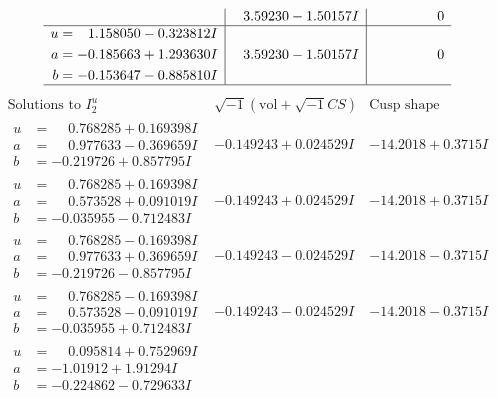 \documentclass[1p]{elsarticle_modified}
\theoremstyle{definition}
\newcommand{\I}{\sqrt{-1}}
\begin{document}
$$\begin{array}{c|c|c}
 & \phantom{-}3.59230 - 1.50157 I & \phantom{-0.000000 } 0 \\ \hline\begin{aligned}
u &= \phantom{-}1.158050 - 0.323812 I \\
a &= -0.185663 + 1.293630 I \\
b &= -0.153647 - 0.885810 I\end{aligned}
 & \phantom{-}3.59230 - 1.50157 I & \phantom{-0.000000 } 0\\
 \hline 
 \end{array}$$\newpage$$\begin{array}{c|c|c}  
\text{Solutions to }I^u_{2}& \I (\text{vol} + \sqrt{-1}CS) & \text{Cusp shape}\\
 \hline 
\begin{aligned}
u &= \phantom{-}0.768285 + 0.169398 I \\
a &= \phantom{-}0.977633 - 0.369659 I \\
b &= -0.219726 + 0.857795 I\end{aligned}
 & -0.149243 + 0.024529 I & -14.2018 + 0.3715 I \\ \hline\begin{aligned}
u &= \phantom{-}0.768285 + 0.169398 I \\
a &= \phantom{-}0.573528 + 0.091019 I \\
b &= -0.035955 - 0.712483 I\end{aligned}
 & -0.149243 + 0.024529 I & -14.2018 + 0.3715 I \\ \hline\begin{aligned}
u &= \phantom{-}0.768285 - 0.169398 I \\
a &= \phantom{-}0.977633 + 0.369659 I \\
b &= -0.219726 - 0.857795 I\end{aligned}
 & -0.149243 - 0.024529 I & -14.2018 - 0.3715 I \\ \hline\begin{aligned}
u &= \phantom{-}0.768285 - 0.169398 I \\
a &= \phantom{-}0.573528 - 0.091019 I \\
b &= -0.035955 + 0.712483 I\end{aligned}
 & -0.149243 - 0.024529 I & -14.2018 - 0.3715 I \\ \hline\begin{aligned}
u &= \phantom{-}0.095814 + 0.752969 I \\
a &= -1.01912 + 1.91294 I \\
b &= -0.224862 - 0.729633 I\end{aligned}

\end{array}$$
\end{document}
